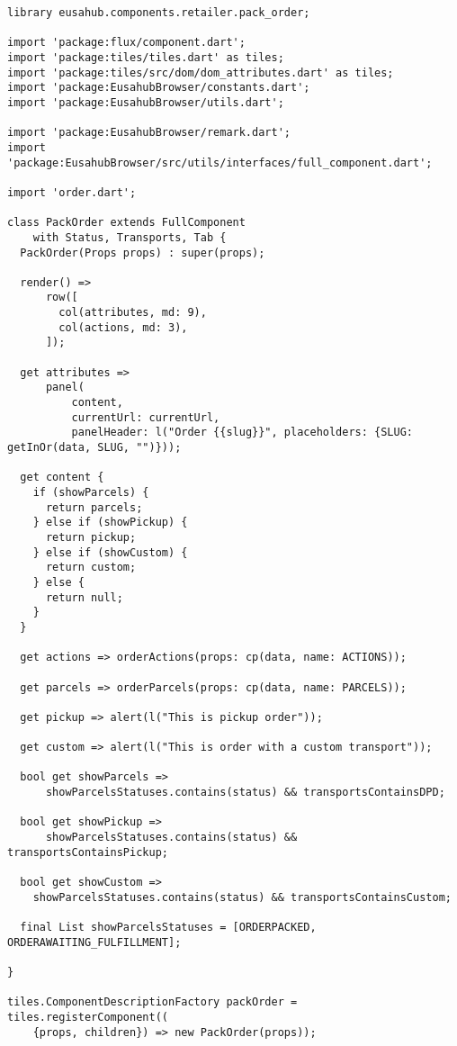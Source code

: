 \begin{lstlisting}[caption=Komponent v Darte s Flux-om, label={lst:dartComponent}]
library eusahub.components.retailer.pack_order;

import 'package:flux/component.dart';
import 'package:tiles/tiles.dart' as tiles;
import 'package:tiles/src/dom/dom_attributes.dart' as tiles;
import 'package:EusahubBrowser/constants.dart';
import 'package:EusahubBrowser/utils.dart';

import 'package:EusahubBrowser/remark.dart';
import 'package:EusahubBrowser/src/utils/interfaces/full_component.dart';

import 'order.dart';

class PackOrder extends FullComponent
    with Status, Transports, Tab {
  PackOrder(Props props) : super(props);

  render() =>
      row([
        col(attributes, md: 9),
        col(actions, md: 3),
      ]);

  get attributes =>
      panel(
          content,
          currentUrl: currentUrl,
          panelHeader: l("Order {{slug}}", placeholders: {SLUG: getInOr(data, SLUG, "")}));

  get content {
    if (showParcels) {
      return parcels;
    } else if (showPickup) {
      return pickup;
    } else if (showCustom) {
      return custom;
    } else {
      return null;
    }
  }

  get actions => orderActions(props: cp(data, name: ACTIONS));

  get parcels => orderParcels(props: cp(data, name: PARCELS));

  get pickup => alert(l("This is pickup order"));

  get custom => alert(l("This is order with a custom transport"));

  bool get showParcels =>
      showParcelsStatuses.contains(status) && transportsContainsDPD;

  bool get showPickup =>
      showParcelsStatuses.contains(status) && transportsContainsPickup;

  bool get showCustom =>
    showParcelsStatuses.contains(status) && transportsContainsCustom;

  final List showParcelsStatuses = [ORDERPACKED, ORDERAWAITING_FULFILLMENT];

}

tiles.ComponentDescriptionFactory packOrder = tiles.registerComponent((
    {props, children}) => new PackOrder(props));

\end{lstlisting}

